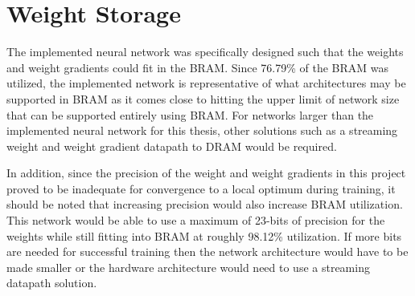 \section{Weight Storage}
The implemented neural network was specifically designed such that the weights and weight gradients could fit in the BRAM. Since 76.79\% of the BRAM was utilized, the implemented network is representative of what architectures may be supported in BRAM as it comes close to hitting the upper limit of network size that can be supported entirely using BRAM. For networks larger than the implemented neural network for this thesis, other solutions such as a streaming weight and weight gradient datapath to DRAM would be required. 

In addition, since the precision of the weight and weight gradients in this project proved to be inadequate for convergence to a local optimum during training, it should be noted that increasing precision would also increase BRAM utilization. This network would be able to use a maximum of 23-bits of precision for the weights while still fitting into BRAM at roughly 98.12\% utilization. If more bits are needed for successful training then the network architecture would have to be made smaller or the hardware architecture would need to use a streaming datapath solution.
